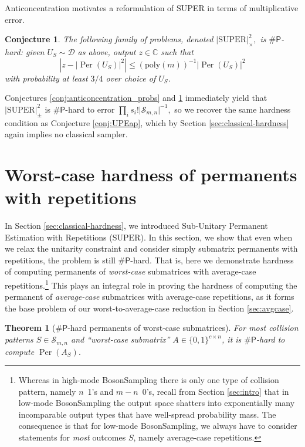 \documentclass[11pt]{article}
\theoremstyle{plain}
\theoremstyle{plain}
\theoremstyle{plain}
\newtheorem{thm}{Theorem}
\theoremstyle{plain}
\theoremstyle{plain}
\theoremstyle{plain}
\theoremstyle{plain}
\theoremstyle{remark}
\theoremstyle{remark}
\theoremstyle{plain}
\theoremstyle{plain}
\newtheorem{conj}{Conjecture}
\theoremstyle{plain}
\theoremstyle{plain}
\newcommand{\Per}{\operatorname{Per}}
\newcommand{\superap}{\lvert \mathrm{SUPER}\rvert^2_\pm}
\newcommand{\supermp}{\lvert \mathrm{SUPER}\rvert^2_\times}
\newcommand{\Smn}{\mathcal{S}_{m,n}}
\newcommand{\sharP}{\#\mathsf{P}}
\newcommand\poly[1]{\mathrm{poly}(#1)}
\begin{document}
Anticoncentration motivates a reformulation of SUPER in terms of multiplicative error. 


\begin{conj}
\label{conj:UPEmp}The following family of problems, denoted $\supermp,$ is $\sharP$-hard: given $U_S\sim\mathcal{D}$ as above, 
output $z \in \mathbb C$ such that 
\[
\left|z - |\Per(U_S)|^2 \right| \le (\poly{m})^{-1} |\Per(U_S)|^2
\]
with probability at least $3/4$ over choice of $U_S$.
\end{conj}

Conjectures \ref{conj:anticoncentration_probs} and \ref{conj:UPEmp} immediately yield that $\superap$ is $\sharP$-hard to error $  \prod_i s_i! \vert\Smn\vert^{-1},$ so we recover the same hardness condition as Conjecture \ref{conj:UPEap}, which by Section \ref{sec:classical-hardness} again implies no classical sampler. 

\section{Worst-case hardness of permanents with repetitions} \label{sec:worst-case}

In Section \ref{sec:classical-hardness}, we introduced Sub-Unitary Permanent Estimation with Repetitions ($\mathrm{SUPER}$). In this section, we show that even when we relax the unitarity constraint and consider simply submatrix permanents with repetitions, the problem is still $\sharP$-hard. That is, here we demonstrate hardness of computing permanents of \textit{worst-case} submatrices with average-case repetitions.\footnote{Whereas in high-mode BosonSampling there is only one type of collision pattern, namely $n$~1's and $m-n$~0's, recall from Section \ref{sec:intro} that in low-mode BosonSampling the output space shatters into exponentially many incomparable output types that have well-spread probability mass. The consequence is that for low-mode BosonSampling, we always have to consider statements for \textit{most} outcomes $S$, namely average-case repetitions.} This plays an integral role in proving the hardness of computing the permanent of \textit{average-case} submatrices with average-case repetitions, as it forms the base problem of our worst-to-average-case reduction in Section \ref{sec:avgcase}.


\begin{thm}[$\sharP$-hard permanents of worst-case submatrices]\label{thm:worst}
    For most collision patterns $S\in\Smn$ and ``worst-case submatrix''  $A \in \{0, 1\}^{c \times n}$, it is $\sharP$-hard to compute $\Per(A_S).$
\end{thm}
\end{document}
